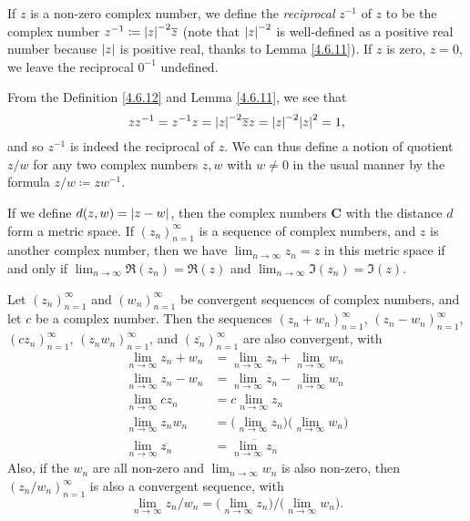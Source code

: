 \begin{definition}\label{4.6.12}
    If \(z\) is a non-zero complex number, we define the \emph{reciprocal} \(z^{-1}\) of \(z\) to be the complex number \(z^{-1} \coloneqq \abs*{z}^{-2} \overline{z}\)
    (note that \(\abs*{z}^{-2}\) is well-defined as a positive real number because \(\abs*{z}\) is positive real, thanks to Lemma \ref{4.6.11}).
    If \(z\) is zero, \(z = 0\), we leave the reciprocal \(0^{-1}\) undefined.
\end{definition}

\begin{note}
    From the Definition \ref{4.6.12} and Lemma \ref{4.6.11}, we see that
    \[
        z z^{-1} = z^{-1} z = \abs*{z}^{-2} \overline{z} z = \abs*{z}^{-2} \abs*{z}^2 = 1,
    \]
    and so \(z^{-1}\) is indeed the reciprocal of \(z\).
    We can thus define a notion of quotient \(z / w\) for any two complex numbers \(z, w\) with \(w \neq 0\) in the usual manner by the formula \(z / w \coloneqq z w^{-1}\).
\end{note}

\begin{lemma}\label{4.6.13}
    If we define \(d(z, w) = \abs*{z - w}\), then the complex numbers \(\mathbf{C}\) with the distance \(d\) form a metric space.
    If \((z_n)_{n = 1}^\infty\) is a sequence of complex numbers, and \(z\) is another complex number, then we have \(\lim_{n \to \infty} z_n = z\) in this metric space if and only if \(\lim_{n \to \infty} \Re(z_n) = \Re(z)\) and \(\lim_{n \to \infty} \Im(z_n) = \Im(z)\).
\end{lemma}

\begin{lemma}\label{4.6.14}
    Let \((z_n)_{n = 1}^\infty\) and \((w_n)_{n = 1}^\infty\) be convergent sequences of complex numbers, and let \(c\) be a complex number.
    Then the sequences \((z_n + w_n)_{n = 1}^\infty\), \((z_n - w_n)_{n = 1}^\infty\), \((c z_n)_{n = 1}^\infty\), \((z_n w_n)_{n = 1}^\infty\), and \((\overline{z_n})_{n = 1}^\infty\) are also convergent, with
    \begin{align*}
        \lim_{n \to \infty} z_n + w_n      & = \lim_{n \to \infty} z_n + \lim_{n \to \infty} w_n                       \\
        \lim_{n \to \infty} z_n - w_n      & = \lim_{n \to \infty} z_n - \lim_{n \to \infty} w_n                       \\
        \lim_{n \to \infty} c z_n          & = c \lim_{n \to \infty} z_n                                               \\
        \lim_{n \to \infty} z_n w_n        & = \bigg(\lim_{n \to \infty} z_n\bigg) \bigg(\lim_{n \to \infty} w_n\bigg) \\
        \lim_{n \to \infty} \overline{z_n} & = \overline{\lim_{n \to \infty} z_n}
    \end{align*}
    Also, if the \(w_n\) are all non-zero and \(\lim_{n \to \infty} w_n\) is also non-zero, then \((z_n / w_n)_{n = 1}^\infty\) is also a convergent sequence, with
    \[
        \lim_{n \to \infty} z_n / w_n = \bigg(\lim_{n \to \infty} z_n\bigg) / \bigg(\lim_{n \to \infty} w_n\bigg).
    \]
\end{lemma}

